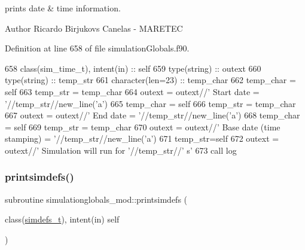 prints date \& time information. 

\begin{DoxyAuthor}{Author}
Ricardo Birjukovs Canelas -\/ M\+A\+R\+E\+T\+EC 
\end{DoxyAuthor}


Definition at line 658 of file simulation\+Globals.\+f90.


\begin{DoxyCode}
658     \textcolor{keywordtype}{class}(sim\_time\_t), \textcolor{keywordtype}{intent(in)} :: self
659     \textcolor{keywordtype}{type}(string) :: outext
660     \textcolor{keywordtype}{type}(string) :: temp\_str
661     \textcolor{keywordtype}{character(len=23)} :: temp\_char
662     temp\_char = self%
663     temp\_str = temp\_char
664     outext = outext//\textcolor{stringliteral}{'      Start date                = '}//temp\_str//new\_line(\textcolor{stringliteral}{'a'})
665     temp\_char = self%
666     temp\_str = temp\_char
667     outext = outext//\textcolor{stringliteral}{'       End date                  = '}//temp\_str//new\_line(\textcolor{stringliteral}{'a'})
668     temp\_char = self%
669     temp\_str = temp\_char
670     outext = outext//\textcolor{stringliteral}{'       Base date (time stamping) = '}//temp\_str//new\_line(\textcolor{stringliteral}{'a'})
671     temp\_str=self%
672     outext = outext//\textcolor{stringliteral}{'       Simulation will run for '}//temp\_str//\textcolor{stringliteral}{' s'}
673     \textcolor{keyword}{call }log%
\end{DoxyCode}
\mbox{\label{namespacesimulationglobals__mod_a54196bff569fc838730ba39a722319ff}} 
\subsubsection{\texorpdfstring{printsimdefs()}{printsimdefs()}}
{\footnotesize\ttfamily subroutine simulationglobals\+\_\+mod\+::printsimdefs (\begin{DoxyParamCaption}\item[{class(\mbox{\hyperlink{structsimulationglobals__mod_1_1simdefs__t}{simdefs\+\_\+t}}), intent(in)}]{self }\end{DoxyParamCaption})\hspace{0.3cm}{\ttfamily [private]}}



